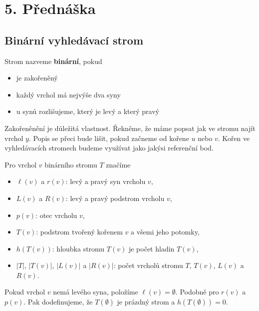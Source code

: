 \section{5. Přednáška}

\subsection{Binární vyhledávací strom}

\begin{definition}
Strom nazveme \textbf{binární}, pokud
    \begin{itemize}
        \item je zakořeněný
        \item každý vrchol má nejvýše dva syny
        \item u synů rozlišujeme, který je levý a který pravý
    \end{itemize}
\end{definition} \bigskip

\begin{remark}
Zakořeněnění je důležitá vlastnost. Řekněme, že máme popsat jak ve stromu najít vrchol $y$. Popis se
přeci bude lišit, pokud začneme od kořene $u$ nebo $v$. Kořen ve vyhledávacích stromech budeme
využívat jako jakýsi referenční bod.
\end{remark} \bigskip

\begin{definition}[Značení]
Pro vrchol $v$ binárního stromu $T$ značíme
\begin{itemize}
    \item $\ell(v)$ a $r(v)$: levý a pravý syn vrcholu $v$,
    \item $L(v)$ a $R(v)$: levý a pravý podstrom vrcholu $v$,
    \item $p(v)$: otec vrcholu $v$,
    \item $T(v)$: podstrom tvořený kořenem $v$ a všemi jeho potomky,
    \item $h(T(v))$: hloubka stromu $T(v)$ je počet hladin $T(v)$,
    \item $|T|$, $|T(v)|$, $|L(v)|$ a $|R(v)|$: počet vrcholů stromu $T$, $T(v)$, $L(v)$ a $R(v)$.
\end{itemize}
Pokud vrchol $v$ nemá levého syna, položíme $\ell(v) = \emptyset$. Podobně pro $r(v)$ a $p(v)$.\newline
Pak dodefinujeme, že $T(\emptyset)$ je prázdný strom a $h(T(\emptyset)) = 0$.
\end{definition} \bigskip

